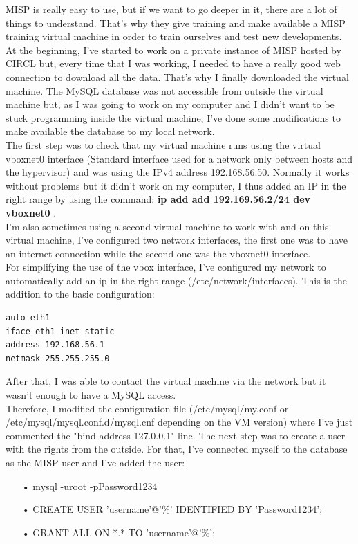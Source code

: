 \documentclass{eplmastersthesis}
\begin{document}
MISP is really easy to use, but if we want to go deeper in it, there are a lot of things to understand. That's why they give training and make available a MISP training virtual machine in order to train ourselves and test new developments.\\
At the beginning, I've started to work on a private instance of MISP hosted by CIRCL but, every time that I was working, I needed to have a really good web connection to download all the data. That's why I finally downloaded the virtual machine. 
The MySQL database was not accessible from outside the virtual machine but, as I was going to work on my computer and I didn't want to be stuck programming inside the virtual machine, I've done some modifications to make available the database to my local network.\\
The first step was to check that my virtual machine runs using the virtual vboxnet0 interface (Standard interface used for a network only between hosts and the hypervisor) and was using the IPv4 address 192.168.56.50. Normally it works without problems but it didn't work on my computer, I thus added an IP in the right range by using the command:
\textbf{ip add add 192.169.56.2/24 dev vboxnet0} .\\
I'm also sometimes using a second virtual machine to work with and on this virtual machine, I've configured two network interfaces, the first one was to have an internet connection while the second one was the vboxnet0 interface.\\
For simplifying the use of the vbox interface, I've configured my network to automatically add an ip in the right range (/etc/network/interfaces). This is the addition to the basic configuration:
\begin{verbatim}
auto eth1
iface eth1 inet static
address 192.168.56.1
netmask 255.255.255.0
\end{verbatim}
 
After that, I was able to contact the virtual machine via the network but it wasn't enough to have a MySQL access. \\
Therefore, I modified the configuration file (/etc/mysql/my.conf or /etc/mysql/mysql.conf.d/mysql.cnf depending on the VM version) where I've just commented the "bind-address 127.0.0.1" line.
The next step was to create a user with the rights from the outside. For that, I've connected myself to the database as the MISP user and I've added the user:
\begin{itemize}
\item[•] mysql -uroot -pPassword1234 
\item[•] CREATE USER 'username'@'\%' IDENTIFIED BY 'Password1234';
\item[•] GRANT ALL ON *.* TO 'username'@'\%';
\end{itemize}
\end{document}
